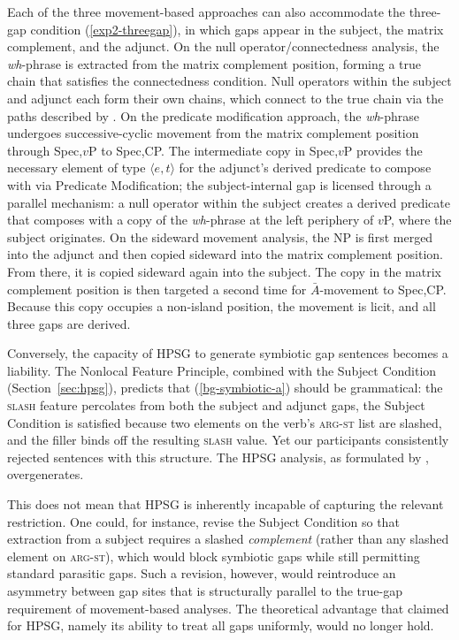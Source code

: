 \documentclass[12pt]{article}
\begin{document}
Each of the three movement-based approaches can also accommodate the three-gap condition (\ref{exp2-threegap}), in which gaps appear in the subject, the matrix complement, and the adjunct. On the null operator/connectedness analysis, the \emph{wh}-phrase is extracted from the matrix complement position, forming a true chain that satisfies the connectedness condition. Null operators within the subject and adjunct each form their own chains, which connect to the true chain via the paths described by \citet{kayne1983}. On the predicate modification approach, the \emph{wh}-phrase undergoes successive-cyclic movement from the matrix complement position through Spec,$v$P to Spec,CP. The intermediate copy in Spec,$v$P provides the necessary element of type $\langle e,t \rangle$ for the adjunct's derived predicate to compose with via Predicate Modification; the subject-internal gap is licensed through a parallel mechanism: a null operator within the subject creates a derived predicate that composes with a copy of the \emph{wh}-phrase at the left periphery of $v$P, where the subject originates. On the sideward movement analysis, the NP is first merged into the adjunct and then copied sideward into the matrix complement position. From there, it is copied sideward again into the subject. The copy in the matrix complement position is then targeted a second time for $\bar{A}$-movement to Spec,CP. Because this copy occupies a non-island position, the movement is licit, and all three gaps are derived.

Conversely, the capacity of HPSG to generate symbiotic gap sentences becomes a liability. The Nonlocal Feature Principle, combined with the Subject Condition (Section~\ref{sec:hpsg}), predicts that (\ref{bg-symbiotic-a}) should be grammatical: the \textsc{slash} feature percolates from both the subject and adjunct gaps, the Subject Condition is satisfied because two elements on the verb's \textsc{arg-st} list are slashed, and the filler binds off the resulting \textsc{slash} value. Yet our participants consistently rejected sentences with this structure. The HPSG analysis, as formulated by \citeauthor{levine2003}, overgenerates.

This does not mean that HPSG is inherently incapable of capturing the relevant restriction. One could, for instance, revise the Subject Condition so that extraction from a subject requires a slashed \emph{complement} (rather than any slashed element on \textsc{arg-st}), which would block symbiotic gaps while still permitting standard parasitic gaps. Such a revision, however, would reintroduce an asymmetry between gap sites that is structurally parallel to the true-gap requirement of movement-based analyses. The theoretical advantage that \citeauthor{levine2003} claimed for HPSG, namely its ability to treat all gaps uniformly, would no longer hold.
\end{document}
